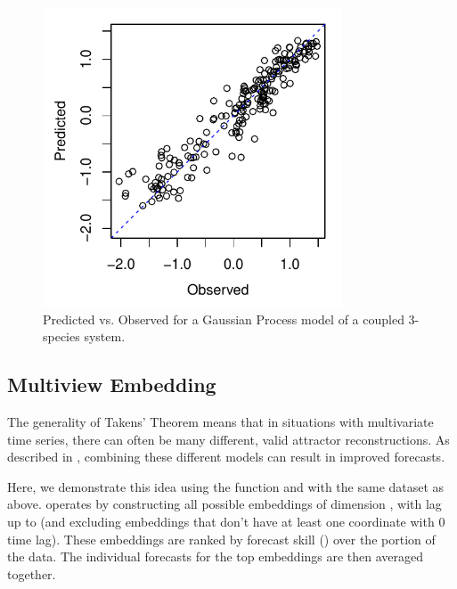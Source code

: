 \documentclass[article]{jss}
\begin{document}
\begin{figure}[t!]
\centering
\includegraphics[width=3.5in]{article-gp-obs-vs-pred}
\caption{\label{fig:gp-obs-vs-pred} Predicted vs. Observed for a Gaussian Process model of a coupled 3-species system.}
\end{figure}

\subsection{Multiview Embedding}\label{sec:multiview-embedding}

The generality of Takens' Theorem means that in situations with multivariate time series, there can often be many different, valid attractor reconstructions. As described in \citet{Ye_2016}, combining these different models can result in improved forecasts.

Here, we demonstrate this idea using the  function and with the same dataset as above.  operates by constructing all possible embeddings of dimension , with lag up to  (and excluding embeddings that don't have at least one coordinate with 0 time lag). These embeddings are ranked by forecast skill () over the  portion of the data. The individual forecasts for the top  embeddings are then averaged together.
\end{document}
